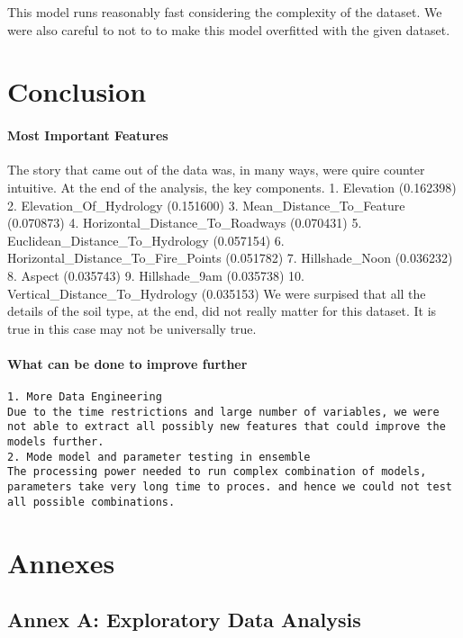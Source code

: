 \documentclass[11pt]{article}
\begin{document}
This model runs reasonably fast considering the complexity of the
dataset. We were also careful to not to to make this model overfitted
with the given dataset.

    \section{Conclusion}\label{conclusion}

    \paragraph{Most Important Features}\label{most-important-features}

The story that came out of the data was, in many ways, were quire
counter intuitive. At the end of the analysis, the key components. 1.
Elevation (0.162398) 2. Elevation\_Of\_Hydrology (0.151600) 3.
Mean\_Distance\_To\_Feature (0.070873) 4.
Horizontal\_Distance\_To\_Roadways (0.070431) 5.
Euclidean\_Distance\_To\_Hydrology (0.057154) 6.
Horizontal\_Distance\_To\_Fire\_Points (0.051782) 7. Hillshade\_Noon
(0.036232) 8. Aspect (0.035743) 9. Hillshade\_9am (0.035738) 10.
Vertical\_Distance\_To\_Hydrology (0.035153) We were surpised that all
the details of the soil type, at the end, did not really matter for this
dataset. It is true in this case may not be universally true.

\paragraph{What can be done to improve
further}\label{what-can-be-done-to-improve-further}

\begin{verbatim}
1. More Data Engineering
Due to the time restrictions and large number of variables, we were not able to extract all possibly new features that could improve the models further.
2. Mode model and parameter testing in ensemble
The processing power needed to run complex combination of models, parameters take very long time to proces. and hence we could not test all possible combinations.
\end{verbatim}

    \section{Annexes}\label{annexes}

    \subsection{Annex A: Exploratory Data
Analysis}\label{annex-a-exploratory-data-analysis}
\end{document}
